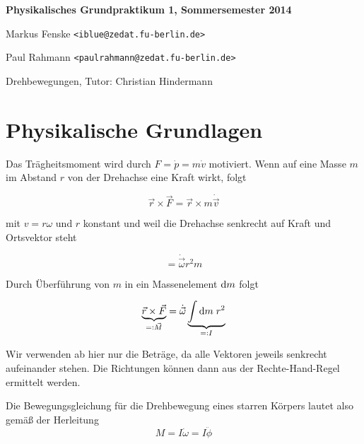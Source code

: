 \documentclass[a4paper,german,12pt,smallheadings]{scrartcl}
\begin{document}
\begin{titlepage}

\end{titlepage}

\allowdisplaybreaks %
\begin{center}
\bfseries %
\sffamily %
\vspace{-40pt}
Physikalisches Grundpraktikum 1, Sommersemester 2014

Markus Fenske \texttt{<iblue@zedat.fu-berlin.de>}

Paul Rahmann \texttt{<paulrahmann@zedat.fu-berlin.de>}

Drehbewegungen, Tutor: Christian Hindermann
\vspace{-10pt}
\end{center}

\section{Physikalische Grundlagen}
Das Trägheitsmoment wird durch $F = \dot{p} = m \dot{v}$ motiviert. Wenn auf eine Masse $m$
im Abstand $r$ von der Drehachse eine Kraft wirkt, folgt

\begin{equation}
  \vec{r} \times \vec{F}
  = \vec{r} \times m \dot{\vec{v}}
\end{equation}

mit $v = r \omega$ und $r$ konstant und weil die Drehachse senkrecht auf Kraft
und Ortsvektor steht

\begin{equation}
  = \dot{\vec{\omega}} r^2 m
\end{equation}

Durch Überführung von $m$ in ein Massenelement $\dif m$ folgt

\begin{equation}
  \underbrace{\vec{r} \times \vec{F}}_{=: \vec{M}} = \dot{\vec{\omega}} \underbrace{\int \dif m \; r^2}_{=: I}
\end{equation}

Wir verwenden ab hier nur die Beträge, da alle Vektoren jeweils senkrecht
aufeinander stehen. Die Richtungen können dann aus der Rechte-Hand-Regel
ermittelt werden.

Die Bewegungsgleichung für die Drehbewegung eines starren Körpers lautet also gemäß der Herleitung
\begin{equation}
  M = I \dot{\omega} = I \ddot{\phi}
\end{equation}
\end{document}
